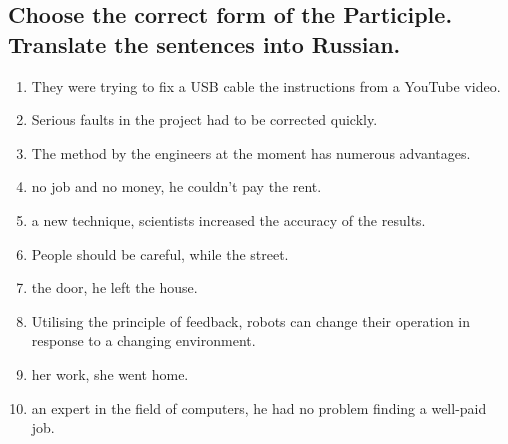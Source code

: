 \subsection*{Choose the correct form of the Participle. Translate the sentences into
      Russian.}
\begin{enumerate}
      \item They were trying to fix a USB cable \underline{\hspace{2cm}} the
            instructions from a YouTube video.
      \item Serious faults \underline{\hspace{2cm}} in the project had to be corrected
            quickly.
      \item The method \underline{\hspace{2cm}} by the engineers at the moment has
            numerous advantages.
      \item \underline{\hspace{2cm}} no job and no money, he couldn’t pay the rent.
      \item \underline{\hspace{2cm}} a new technique, scientists increased the accuracy
            of the results.
      \item People should be careful, while \underline{\hspace{2cm}} the street.
      \item \underline{\hspace{2cm}} the door, he left the house.
      \item Utilising the principle of feedback, robots can change their operation in
            response to a changing environment.
      \item \underline{\hspace{2cm}} her work, she went home.
      \item \underline{\hspace{2cm}} an expert in the field of computers, he had no
            problem finding a well-paid job.
\end{enumerate}

